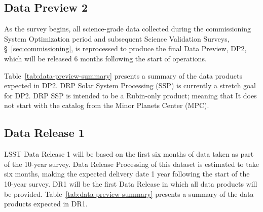 \subsection{Data Preview 2}
\label{ssec:dp2}

As the survey begins, all science-grade data collected during the commissioning System Optimization period and subsequent Science Validation Surveys, \S~\ref{sec:commissioning}, is reprocessed to produce the final Data Preview, DP2, which will be released 6 months following the start of operations.

Table~\ref{tab:data-preview-summary} presents a summary of the data products expected in DP2.
DRP Solar System Processing (SSP)  is currently a stretch goal for DP2. 
DRP SSP is intended to be a Rubin-only product; meaning that  It does not start with the catalog from the Minor Planets Center (MPC).


\subsection{Data Release 1}
\label{ssec:dr1}

LSST Data Release 1 will be based on the first six months of data taken as part of the 10-year survey. 
Data Release Processing of this dataset is estimated to take six months, making the expected delivery date 1 year following the start of the 10-year survey.
DR1 will be the first Data Release in which all data products will be provided.
Table~\ref{tab:data-preview-summary} presents a summary of the data products expected in DR1.



